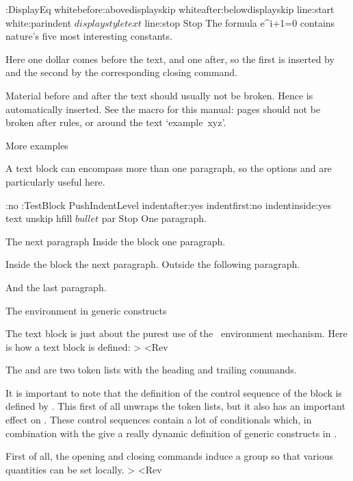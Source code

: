 \Example
\DefineTextBlock:DisplayEq 
 whitebefore:abovedisplayskip whiteafter:belowdisplayskip
 line:start white:parindent $ displaystyle text $ line:stop Stop
The formula
\DisplayEq e^{\pi i}+1=0\>
contains nature's five most interesting constants.
\ExampleStop

Here one dollar comes before the text, and one after, so the first is
inserted by  and the second by the corresponding
closing command.

Material before and after the text should usually not be broken.
Hence  is automatically inserted. See the 
macro for this manual: pages should not be broken after rules, or
around the text `example~xyz'.

\Section More examples

A text block can encompass more than one paragraph, so the options
 and  are particularly useful here.

\Example
\AlwaysIndent:no
\DefineTextBlock:TestBlock PushIndentLevel
 indentafter:yes indentfirst:no indentinside:yes 
 text unskip hfill $ bullet $ par Stop
One paragraph.\par The next paragraph
\TestBlock Inside the block one paragraph.\par
Inside the block the next paragraph.\>
Outside the following paragraph.\par And the last paragraph.
\ExampleStop
 
\ImpNote 
{} The environment in generic constructs

The text block is just about the purest use of the \Lollipop\
environment mechanism. Here is how a text block is defined:
\Ver>
\def\@DefineTextBlock{
    \csarg\edef{\@name}{\@gen@open
        \the\before@coms
        }
    \@DefineStopCommand{\the\after@coms \@gen@close}
    }<Rev

The  and  are two token lists with
the heading and trailing commands.

It is important to note that the definition of the control sequence
of the block is defined by \cs{edef}. This first of all unwraps the
token lists, but it also has an important effect on
. These control sequences contain a lot of
conditionals which, in combination with the  give a really
dynamic definition of generic constructs in \Lollipop.

First of all, the opening and closing commands induce a group
so that various quantities can be set locally.
\Ver>
\def\@gen@open{\outer@start@commands 
    \begingroup \inner@start@commands}
\def\@gen@close{\inner@end@commands 
    \endgroup \outer@end@commands}<Rev

